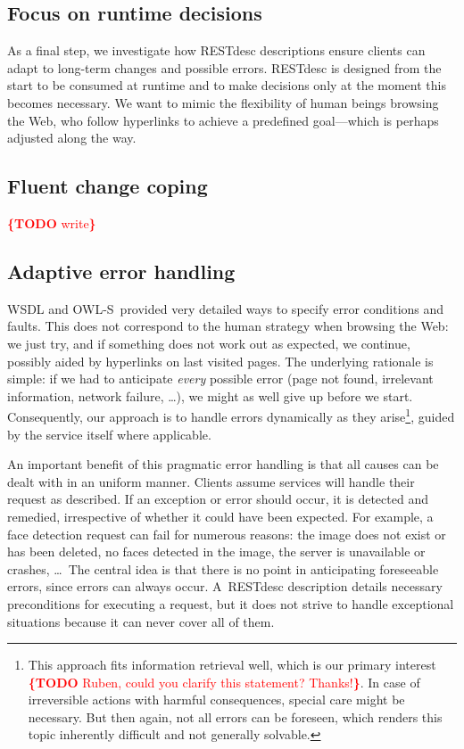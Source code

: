 \documentclass[runningheads,a4paper, twocolumn]{llncs}
\newcommand{\todo}[1]{\noindent\textcolor{red}{{\bf \{TODO} #1{\bf \}}}}
\newcommand{\owls}{\mbox{OWL-S}}
\begin{document}
\subsection{Focus on runtime decisions}
As a final step, we investigate how RESTdesc descriptions ensure clients can adapt to long-term changes and possible errors. RESTdesc is designed from the start to be consumed at runtime and to make decisions only at the moment this becomes necessary. We want to mimic the flexibility of human beings browsing the Web, who follow hyperlinks to achieve a predefined goal---which is perhaps adjusted along the way.

\subsection{Fluent change coping}
\todo{write}

\subsection{Adaptive error handling}
WSDL and \owls\ provided very detailed ways to specify error conditions and faults. This does not correspond to the human strategy when browsing the Web: we just try, and if something does not work out as expected, we continue, possibly aided by hyperlinks on last visited pages. The underlying rationale is simple: if we had to anticipate \emph{every} possible error (page not found, irrelevant information, network failure, \ldots), we might as well give up before we start. Consequently, our approach is to handle errors dynamically as they arise\footnote{This approach fits information retrieval well, which is our primary interest \todo{Ruben, could you clarify this statement? Thanks!}. In case of irreversible actions with harmful consequences, special care might be necessary. But then again, not all errors can be foreseen, which renders this topic inherently difficult and not generally solvable.}, guided by the service itself where applicable.

An important benefit of this pragmatic error handling is that all causes can be dealt with in an uniform manner. Clients assume services will handle their request as described. If an exception or error should occur, it is detected and remedied, irrespective of whether it could have been expected. For example, a face detection request can fail for numerous reasons: the image does not exist or has been deleted, no faces detected in the image, the server is unavailable or crashes, \ldots\ The central idea is that there is no point in anticipating foreseeable errors, since errors can always occur. A~RESTdesc description details necessary preconditions for executing a request, but it does not strive to handle exceptional situations because it can never cover all of them.
\end{document}
